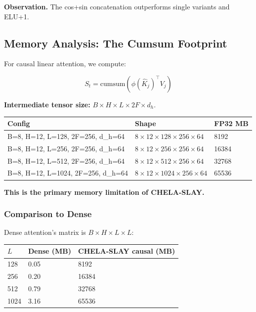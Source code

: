 \textbf{Observation.} The cos+sin concatenation outperforms single variants and 
ELU+1.

\subsection{Memory Analysis: The Cumsum Footprint}

For causal linear attention, we compute:

\[
S_t = \text{cumsum}(\phi(\hat{K}_j)^\top V_j)
\]

\textbf{Intermediate tensor size:} $B \times H \times L \times 2F \times d_h$.

\begin{table}[H]
\centering
\small
\begin{tabular}{lll}
\toprule
\textbf{Config} & \textbf{Shape} & \textbf{FP32 MB} \\
\midrule
B=8, H=12, L=128, 2F=256, d\_h=64 & $8 \times 12 \times 128 \times 256 \times 64$ & 8192 \\
B=8, H=12, L=256, 2F=256, d\_h=64 & $8 \times 12 \times 256 \times 256 \times 64$ & 16384 \\
B=8, H=12, L=512, 2F=256, d\_h=64 & $8 \times 12 \times 512 \times 256 \times 64$ & 32768 \\
B=8, H=12, L=1024, 2F=256, d\_h=64 & $8 \times 12 \times 1024 \times 256 \times 64$ & 65536 \\
\bottomrule
\end{tabular}
\end{table}

\textbf{This is the primary memory limitation of CHELA-SLAY.}

\subsubsection{Comparison to Dense}

Dense attention's matrix is $B \times H \times L \times L$:

\begin{table}[H]
\centering
\small
\begin{tabular}{lll}
\toprule
\textbf{$L$} & \textbf{Dense (MB)} & \textbf{CHELA-SLAY causal (MB)} \\
\midrule
128 & 0.05 & 8192 \\
256 & 0.20 & 16384 \\
512 & 0.79 & 32768 \\
1024 & 3.16 & 65536 \\
\bottomrule
\end{tabular}
\end{table}

